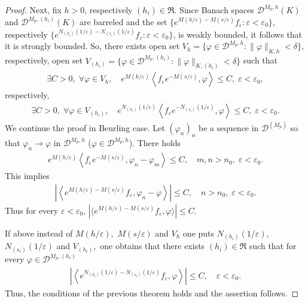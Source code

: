 \documentclass[10pt,a4paper]{amsart}
\begin{document}
\begin{proof}
Next, fix $h>0$, respectively $(h_i)\in\mathfrak R.$  Since Banach spaces $\mathcal{D}^{M_p,h}(K)$ and $\mathcal{D}^{M_p,(h_i)}(K)$ are 
barreled and the set 
$\{e^{M(h/\varepsilon)-M(s/\varepsilon)}f_\varepsilon : \varepsilon<\varepsilon_0\}$, respectively 
$\{e^{N_{(h_i)}(1/\varepsilon)-N_{(s_i)}(1/\varepsilon)}f_\varepsilon:\varepsilon<\varepsilon_0\}$, is weakly bounded, it follows that it is strongly bounded. 
So, there exists open set $V_h=\{\varphi\in\mathcal{D}^{M_p,h}: \|\varphi\|_{K,h}<\delta\},$ respectively, open set $V_{(h_i)}=\{\varphi\in\mathcal{D}^{M_p,(h_i)}: \|\varphi\|_{K,(h_i)}<\delta\}$ such that 
\begin{align*}
\exists C>0,\;\forall \varphi\in V_h,\quad e^{M(k/\varepsilon)}\left\langle f_\varepsilon e^{-M(s/\varepsilon)},\varphi\right\rangle \leq C,\;\varepsilon<\varepsilon_0,
\end{align*}
respectively,
\begin{align*}
\exists C>0,\;\forall \varphi\in V_{(h_i)},\quad e^{N_{(h_i)}(1/\varepsilon)}\left\langle f_\varepsilon e^{-N_{(s_i)}(1/\varepsilon)},\varphi\right\rangle \leq C,\;\varepsilon<\varepsilon_0.
\end{align*}
We continue the proof in Beurling case. Let $(\varphi_n)_n$ be a sequence in $\mathcal{D}^{(M_p)}$ so that $\varphi_n\to \varphi$ in $\mathcal{D}^{M_p,h}$ ($\varphi\in \mathcal{D}^{M_p,h}$). There holds
\begin{align*}
e^{M(h/\varepsilon)}\left\langle f_\varepsilon e^{-M(s/\varepsilon)},\varphi_n-\varphi_m\right\rangle\leq C,\quad m,n>n_0, \;\varepsilon<\varepsilon_0.
\end{align*}
 This implies 
\begin{align*}
\left|\left\langle e^{M(h/\varepsilon)-M(s/\varepsilon)}f_\varepsilon,\varphi_n-\varphi\right\rangle\right|\leq C,\quad n>n_0,\; \varepsilon<\varepsilon_0.
\end{align*}
Thus for every $\varepsilon<\varepsilon_0$,
$
|\langle e^{M(h/\varepsilon)-M(s/\varepsilon)}f_\varepsilon,\varphi\rangle|\leq C.
$

If above instead of $M(h/\varepsilon),$ $M(s/\varepsilon)$ and $V_h$ one puts 
$N_{(h_i)}(1/\varepsilon),$ 
$N_{(s_i)}(1/\varepsilon)$ 
and $V_{(h_i)},$ one obtains that there exists $(h_i)\in \mathfrak{R}$ such that for every $\varphi\in \mathcal{D}^{M_p,(h_i)}$
\begin{align*}
\left|\left\langle e^{N_{(h_i)}(1/\varepsilon)-N_{(s_i)}(1/\varepsilon)}f_\varepsilon,\varphi\right\rangle\right|\leq C,\quad \varepsilon<\varepsilon_0.
\end{align*}
Thus, the conditions of the previous theorem holds and the assertion follows.
\end{proof}
\end{document}
